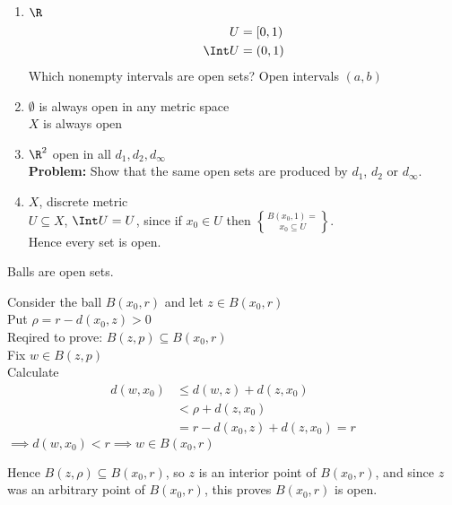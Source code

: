 \ex
\begin{enumerate}
\item $\R$\marginpar{figure: real line $[0,1)$}%
\begin{align*}
U &= [0,1) \\
\Int U &= (0,1)
\end{align*}
Which nonempty intervals are open sets?  Open intervals $(a,b)$
\item $\emptyset$ is always open in any metric space \\
$X$ is always open
\item $\R^2$ %
open in all $d_1,d_2,d_\infty$ \\
\textbf{Problem:} Show that the same open sets are produced by $d_1$, $d_2$ or $d_\infty$.
\item $X$, discrete metric \\
$U\subseteq X$, $\Int U=U$, since if $x_0\in U$ then $B(x_0,1)=\brace{x_0}\subseteq U$. \\
Hence every set is open.
\end{enumerate}

\prop Balls are open sets.

\pf Consider the ball $B(x_0,r)$ and let $z\in B(x_0,r)$ \\
Put $\rho=r-d(x_0,z)>0$ \\
Reqired to prove: $B(z,p)\subseteq B(x_0,r)$ \\
Fix $w\in B(z,p)$ \\
Calculate
\begin{align*}
d(w,x_0) &\leq d(w,z) + d(z,x_0) \\
&< \rho + d(z,x_0) \\
&= r - d(x_0,z) + d(z,x_0) = r
\end{align*}
$\implies d(w,x_0)<r \implies w\in B(x_0,r)$

Hence $B(z,\rho)\subseteq B(x_0,r)$, so $z$ is an interior point of $B(x_0,r)$, and since $z$ was an arbitrary point of $B(x_0,r)$, this proves $B(x_0,r)$ is open.
